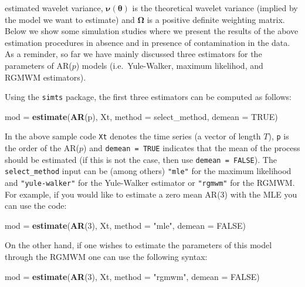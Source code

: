 \documentclass[]{book}
\newenvironment{Shaded}{\begin{snugshade}}{\end{snugshade}}
\newcommand{\DataTypeTok}[1]{\textcolor[rgb]{0.13,0.29,0.53}{#1}}
\newcommand{\DecValTok}[1]{\textcolor[rgb]{0.00,0.00,0.81}{#1}}
\newcommand{\KeywordTok}[1]{\textcolor[rgb]{0.13,0.29,0.53}{\textbf{#1}}}
\newcommand{\NormalTok}[1]{#1}
\newcommand{\OtherTok}[1]{\textcolor[rgb]{0.56,0.35,0.01}{#1}}
\newcommand{\StringTok}[1]{\textcolor[rgb]{0.31,0.60,0.02}{#1}}
\theoremstyle{definition}
\theoremstyle{definition}
\theoremstyle{definition}
\theoremstyle{remark}
\begin{document}
estimated wavelet variance, \(\boldsymbol{\nu}({\boldsymbol{\theta}})\)
is the theoretical wavelet variance (implied by the model we want to
estimate) and \(\boldsymbol{\Omega}\) is a positive definite weighting
matrix. Below we show some simulation studies where we present the
results of the above estimation procedures in absence and in presence of
contamination in the data. As a reminder, so far we have mainly
discussed three estimators for the parameters of AR(\(p\)) models
(i.e.~Yule-Walker, maximum likelihod, and RGMWM estimators).

Using the \texttt{simts} package, the first three estimators can be
computed as follows:

\begin{Shaded}
\begin{Highlighting}[]
\NormalTok{mod =}\StringTok{ }\KeywordTok{estimate}\NormalTok{(}\KeywordTok{AR}\NormalTok{(p), Xt, }\DataTypeTok{method =}\NormalTok{ select_method, }\DataTypeTok{demean =} \OtherTok{TRUE}\NormalTok{)}
\end{Highlighting}
\end{Shaded}

In the above sample code \texttt{Xt} denotes the time series (a vector
of length \(T\)), \texttt{p} is the order of the AR(\(p\)) and
\texttt{demean\ =\ TRUE} indicates that the mean of the process should
be estimated (if this is not the case, then use
\texttt{demean\ =\ FALSE}). The \texttt{select\_method} input can be
(among others) \texttt{"mle"} for the maximum likelihood and
\texttt{"yule-walker"} for the Yule-Walker estimator or \texttt{"rgmwm"}
for the RGMWM. For example, if you would like to estimate a zero mean
AR(3) with the MLE you can use the code:

\begin{Shaded}
\begin{Highlighting}[]
\NormalTok{mod =}\StringTok{ }\KeywordTok{estimate}\NormalTok{(}\KeywordTok{AR}\NormalTok{(}\DecValTok{3}\NormalTok{), Xt, }\DataTypeTok{method =} \StringTok{"mle"}\NormalTok{, }\DataTypeTok{demean =} \OtherTok{FALSE}\NormalTok{)}
\end{Highlighting}
\end{Shaded}

On the other hand, if one wishes to estimate the parameters of this
model through the RGMWM one can use the following syntax:

\begin{Shaded}
\begin{Highlighting}[]
\NormalTok{mod =}\StringTok{ }\KeywordTok{estimate}\NormalTok{(}\KeywordTok{AR}\NormalTok{(}\DecValTok{3}\NormalTok{), Xt, }\DataTypeTok{method =} \StringTok{"rgmwm"}\NormalTok{, }\DataTypeTok{demean =} \OtherTok{FALSE}\NormalTok{)}
\end{Highlighting}
\end{Shaded}
\end{document}
